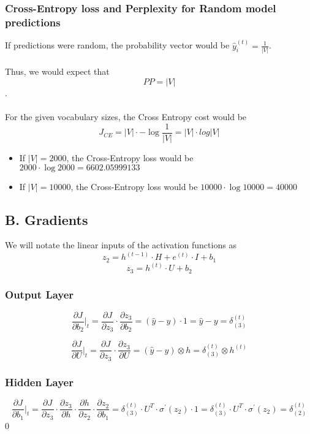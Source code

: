 \documentclass{article}
\begin{document}
\subsubsection*{Cross-Entropy loss and Perplexity for \textbf{Random} model predictions}
If predictions were random, the probability vector would be $\hat y_i^{(t)} = \frac {1} {|V|} $. \\~\\
Thus, we would expect that $$ PP = |V| $$. \\~\\
For the given vocabulary sizes, the Cross Entropy cost would be $$ J_{CE} = |V| \cdot - \log \frac {1} {|V|} = |V| \cdot log |V| $$
\begin{itemize}
\item If $|V| = 2000$, the Cross-Entropy loss would be $ 2000 \cdot \log 2000 = 6602.05999133 $
\item If $|V| = 10000$, the Cross-Entropy loss would be $ 10000 \cdot \log 10000 = 40000 $
\end{itemize}


\subsection*{B. Gradients}
 We will notate the linear inputs of the activation functions as $$ z_2 = h^{(t-1)}\cdot H + e^{(t)}\cdot I+ b_1 $$ $$ z_3 = h^{(t)} \cdot U + b_2$$

\subsubsection*{Output Layer}
$$
	\frac {\partial J}{\partial b_2} \Big|_t = \frac {\partial J}{\partial z_3} \cdot \frac {\partial z_3}{\partial b_2} = (\hat y - y) \cdot 1 = \hat y - y = \delta_{(3)}^{(t)}
$$

$$
	\frac {\partial J}{\partial U} \Big|_t = \frac {\partial J}{\partial z_3} \cdot \frac {\partial z_3}{\partial U} = (\hat y - y) \otimes h = \delta_{(3)}^{(t)} \otimes h^{(t)}
$$

\subsubsection*{Hidden Layer}
$$
	\frac {\partial J}{\partial b_1} \Big|_t= \frac {\partial J}{\partial z_3} \cdot \frac {\partial z_3}{\partial h} \cdot \frac {\partial h}{\partial z_2} \cdot \frac {\partial z_2}{\partial b_1} = \delta_{(3)}^{(t)} \cdot U^{T} \cdot \sigma^{'}(z_2) \cdot 1= \delta_{(3)}^{(t)} \cdot U^{T} \cdot \sigma^{'}(z_2) = \delta_{(2)}^{(t)}
$$0
\end{document}
